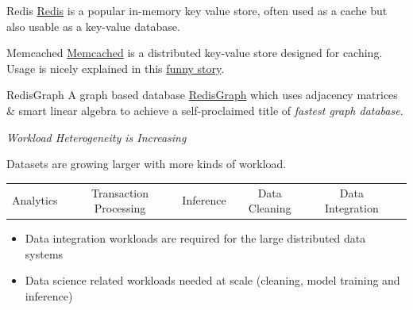 \begin{tcbraster}[raster columns=2,raster equal height]
    \begin{sidenotebox}{Redis}
        \href{https://redis.io/}{Redis} is a popular in-memory key value store, often used as a cache but also usable as a key-value database.
    \end{sidenotebox}
    \begin{sidenotebox}{Memcached}
        \href{https://github.com/memcached/memcached}{Memcached} is a distributed key-value store designed for caching. Usage is nicely explained in this \href{https://github.com/memcached/memcached/wiki/TutorialCachingStory}{funny story}.
    \end{sidenotebox}
\end{tcbraster}
\begin{sidenotebox}{RedisGraph}
    A graph based database \href{https://redis.com/modules/redis-graph/}{RedisGraph} which uses adjacency matrices \& smart linear algebra to achieve a self-proclaimed title of \textit{fastest graph database}.
\end{sidenotebox}
\centerline{\textit{Workload Heterogeneity is Increasing}}
Datasets are growing larger with more kinds of workload.
\begin{center}
    \begin{tabular}{c c c c c c}
        Analytics & Transaction Processing & Inference & Data Cleaning & Data Integration \\
    \end{tabular}
\end{center}
\begin{itemize}
    \item Data integration workloads are required for the large distributed data systems
    \item Data science related workloads needed at scale (cleaning, model training and inference)
\end{itemize}

